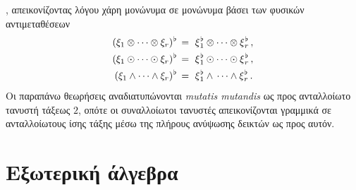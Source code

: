 \documentclass[11pt,a4paper,twoside,openright]{book}
\begin{document}
, απεικονίζοντας λόγου χάρη μονώνυμα σε μονώνυμα βάσει των φυσικών αντιμεταθέσεων
\setlength{\jot}{12pt}
\begin{align}
    (\xi_1 \otimes \dots \otimes \xi_r)^{\hspace{.5pt}\flat}
\,&=\,\,
\xi_{\hspace{.5pt}1}^{\hspace{.5pt}\flat}
\otimes \dots \otimes
\xi_{\hspace{.5pt}r}^{\hspace{.5pt}\flat}\,, \label{eq:extended-flat-monomials-tensor-product} \\
    (\xi_1 \odot \dots \odot \xi_r)^{\hspace{.5pt}\flat}
\,&=\,\,
\xi_{\hspace{.5pt}1}^{\hspace{.5pt}\flat}
\odot \dots \odot
\xi_{\hspace{.5pt}r}^{\hspace{.5pt}\flat}\,, \label{eq:extended-flat-monomials-symmetric-product} \\
    (\xi_1 \wedge \dots \wedge \xi_r)^{\hspace{.5pt}\flat}
\,&=\,\,
\xi_{\hspace{.5pt}1}^{\hspace{.5pt}\flat}
\wedge \,\dots \wedge
\xi_{\hspace{.5pt}r}^{\hspace{.5pt}\flat}\,. \label{eq:extended-flat-monomials-wedge-product}
\end{align}
Οι παραπάνω θεωρήσεις αναδιατυπώνονται \textit{mutatis mutandis} ως προς ανταλλοίωτο τανυστή τάξεως $2$, οπότε οι συναλλοίωτοι τανυστές απεικονίζονται γραμμικά σε ανταλλοίωτους ίσης τάξης μέσω της πλήρους ανύψωσης δεικτών ως προς αυτόν. 

\chapter{Εξωτερική άλγεβρα}
	\label{chapter:exterior-algebra}
	
\end{document}
